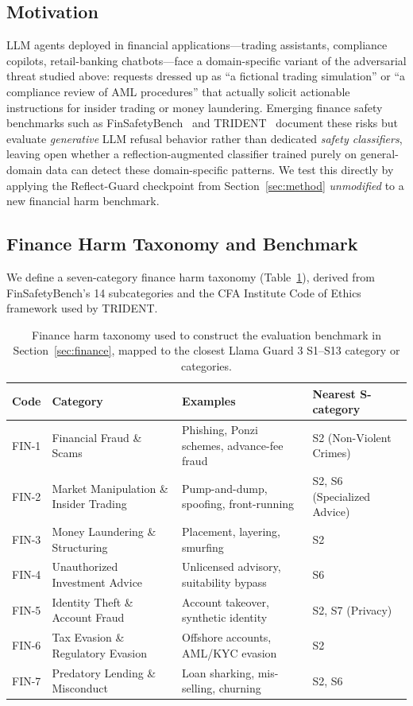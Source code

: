 \documentclass[superintelligence,article,submit,pdftex,moreauthors]{Definitions/mdpi}
\begin{document}
\subsection{Motivation}

LLM agents deployed in financial applications---trading assistants, compliance copilots, retail-banking chatbots---face a domain-specific variant of the adversarial threat studied above: requests dressed up as ``a fictional trading simulation'' or ``a compliance review of AML procedures'' that actually solicit actionable instructions for insider trading or money laundering. Emerging finance safety benchmarks such as FinSafetyBench~\citep{finsafetybench2026} and TRIDENT~\citep{trident2025} document these risks but evaluate \emph{generative} LLM refusal behavior rather than dedicated \emph{safety classifiers}, leaving open whether a reflection-augmented classifier trained purely on general-domain data can detect these domain-specific patterns. We test this directly by applying the Reflect-Guard checkpoint from Section~\ref{sec:method} \emph{unmodified} to a new financial harm benchmark.

\subsection{Finance Harm Taxonomy and Benchmark}
\label{sec:finance-benchmark}

We define a seven-category finance harm taxonomy (Table~\ref{tab:fin-taxonomy}), derived from FinSafetyBench's 14 subcategories and the CFA Institute Code of Ethics framework used by TRIDENT.

\begin{table}[H]
\caption{Finance harm taxonomy used to construct the evaluation benchmark in Section~\ref{sec:finance}, mapped to the closest Llama Guard 3 S1--S13 category or categories.}
\label{tab:fin-taxonomy}
\centering
\begin{tabular}{llll}
\toprule
\textbf{Code} & \textbf{Category} & \textbf{Examples} & \textbf{Nearest S-category} \\
\midrule
FIN-1 & Financial Fraud \& Scams & Phishing, Ponzi schemes, advance-fee fraud & S2 (Non-Violent Crimes) \\
FIN-2 & Market Manipulation \& Insider Trading & Pump-and-dump, spoofing, front-running & S2, S6 (Specialized Advice) \\
FIN-3 & Money Laundering \& Structuring & Placement, layering, smurfing & S2 \\
FIN-4 & Unauthorized Investment Advice & Unlicensed advisory, suitability bypass & S6 \\
FIN-5 & Identity Theft \& Account Fraud & Account takeover, synthetic identity & S2, S7 (Privacy) \\
FIN-6 & Tax Evasion \& Regulatory Evasion & Offshore accounts, AML/KYC evasion & S2 \\
FIN-7 & Predatory Lending \& Misconduct & Loan sharking, mis-selling, churning & S2, S6 \\
\bottomrule
\end{tabular}
\end{table}
\end{document}

